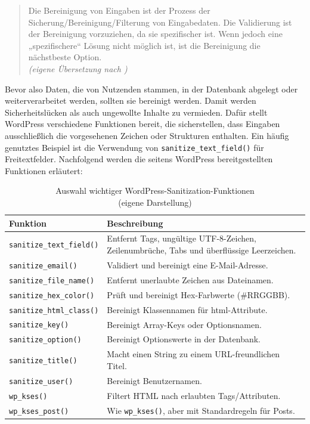 \begin{quote}
 Die Bereinigung von Eingaben ist der Prozess der Sicherung/Bereinigung/Filterung von Eingabedaten.
 Die Validierung ist der Bereinigung vorzuziehen, da sie spezifischer ist.
 Wenn jedoch eine „spezifischere“ Lösung nicht möglich ist, ist die Bereinigung die nächstbeste Option.
 \\[0.5em]
 \emph{(eigene Übersetzung nach \cite{wordpress2024plugin_sanitizing})}
\end{quote}


Bevor also Daten, die von Nutzenden stammen, in der Datenbank abgelegt oder weiterverarbeitet werden,
sollten sie bereinigt werden.
Damit werden Sicherheitslücken als auch ungewollte Inhalte zu vermieden.
Dafür stellt WordPress verschiedene Funktionen bereit, die sicherstellen, dass Eingaben ausschließlich
die vorgesehenen Zeichen oder Strukturen enthalten.
Ein häufig genutztes Beispiel ist die Verwendung von \texttt{sanitize\_text\_field()} für Freitextfelder.
Nachfolgend werden die seitens WordPress bereitgestellten Funktionen erläutert:

\begin{table}[h]
 \centering
 \begin{tabular}{|l|p{8cm}|}
  \hline
  \textbf{Funktion} & \textbf{Beschreibung} \\
  \hline
  \texttt{sanitize\_text\_field()} & Entfernt Tags, ungültige UTF-8-Zeichen, \newline Zeilenumbrüche, Tabs und überflüssige Leerzeichen. \\
  \hline
  \texttt{sanitize\_email()} & Validiert und bereinigt eine E-Mail-Adresse. \\
  \hline
  \texttt{sanitize\_file\_name()} & Entfernt unerlaubte Zeichen aus Dateinamen. \\
  \hline
  \texttt{sanitize\_hex\_color()} & Prüft und bereinigt Hex-Farbwerte (\#RRGGBB). \\
  \hline
  \texttt{sanitize\_html\_class()} & Bereinigt Klassennamen für \gls{html}-Attribute.                                                    \\
  \hline
  \texttt{sanitize\_key()} & Bereinigt Array-Keys oder Optionsnamen. \\
  \hline
  \texttt{sanitize\_option()} & Bereinigt Optionswerte in der Datenbank. \\
  \hline
  \texttt{sanitize\_title()} & Macht einen String zu einem URL-freundlichen Titel. \\
  \hline
  \texttt{sanitize\_user()} & Bereinigt Benutzernamen. \\
  \hline
  \texttt{wp\_kses()} & Filtert HTML nach erlaubten Tags/Attributen. \\
  \hline
  \texttt{wp\_kses\_post()} & Wie \texttt{wp\_kses()}, aber mit Standardregeln für Posts. \\
  \hline
 \end{tabular}
 \caption{Auswahl wichtiger WordPress-Sanitization-Funktionen \\(eigene Darstellung)}
\end{table}

